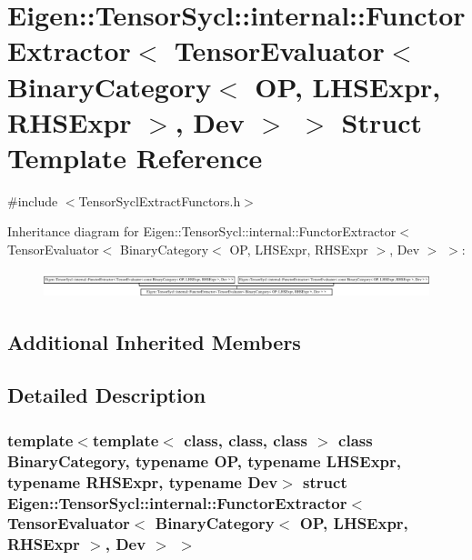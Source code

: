 \hypertarget{struct_eigen_1_1_tensor_sycl_1_1internal_1_1_functor_extractor_3_01_tensor_evaluator_3_01_binary6aa809deae21a95a36f05183e3e880d1}{}\section{Eigen\+:\+:Tensor\+Sycl\+:\+:internal\+:\+:Functor\+Extractor$<$ Tensor\+Evaluator$<$ Binary\+Category$<$ OP, L\+H\+S\+Expr, R\+H\+S\+Expr $>$, Dev $>$ $>$ Struct Template Reference}
\label{struct_eigen_1_1_tensor_sycl_1_1internal_1_1_functor_extractor_3_01_tensor_evaluator_3_01_binary6aa809deae21a95a36f05183e3e880d1}


{\ttfamily \#include $<$Tensor\+Sycl\+Extract\+Functors.\+h$>$}

Inheritance diagram for Eigen\+:\+:Tensor\+Sycl\+:\+:internal\+:\+:Functor\+Extractor$<$ Tensor\+Evaluator$<$ Binary\+Category$<$ OP, L\+H\+S\+Expr, R\+H\+S\+Expr $>$, Dev $>$ $>$\+:\begin{figure}[H]
\begin{center}
\leavevmode
\includegraphics[height=0.768176cm]{struct_eigen_1_1_tensor_sycl_1_1internal_1_1_functor_extractor_3_01_tensor_evaluator_3_01_binary6aa809deae21a95a36f05183e3e880d1}
\end{center}
\end{figure}
\subsection*{Additional Inherited Members}


\subsection{Detailed Description}
\subsubsection*{template$<$template$<$ class, class, class $>$ class Binary\+Category, typename OP, typename L\+H\+S\+Expr, typename R\+H\+S\+Expr, typename Dev$>$\newline
struct Eigen\+::\+Tensor\+Sycl\+::internal\+::\+Functor\+Extractor$<$ Tensor\+Evaluator$<$ Binary\+Category$<$ O\+P, L\+H\+S\+Expr, R\+H\+S\+Expr $>$, Dev $>$ $>$}

